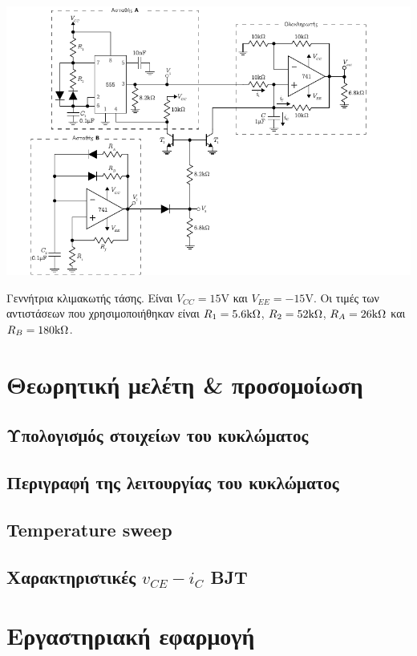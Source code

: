 \begin{center}
	\begin{circuitfig}[H]
		\centering
		\includegraphics[width=14cm]{circuits/micro3_lab2.pdf}
		\caption{Γεννήτρια κλιμακωτής τάσης. Είναι $V_{CC}=15\unit{\volt}$ και $V_{EE}=-15\unit{\volt}$. Οι τιμές των αντιστάσεων που χρησιμοποιήθηκαν είναι $R_1=5.6\kohm$, $R_2=52\kohm$, $R_A=26\kohm$ και $R_B=180\kohm$.}
		\label{circ:2_schematic}
	\end{circuitfig}
\end{center}

\section{Θεωρητική μελέτη \& προσομοίωση}

	\subsection{Υπολογισμός στοιχείων του κυκλώματος}
		

	\subsection{Περιγραφή της λειτουργίας του κυκλώματος}
		

	\subsection{Temperature sweep}
		

	\subsection{Χαρακτηριστικές $v_{CE}-i_C$ BJT}
		

\newpage
\section{Εργαστηριακή εφαρμογή}
	